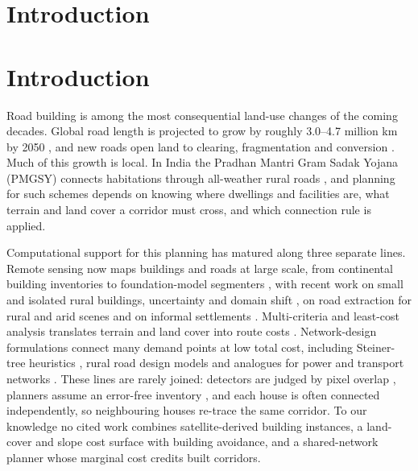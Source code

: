 \documentclass[preprint,12pt]{elsarticle}
\begin{document}
\section{Introduction}
\section{Introduction}
Road building is among the most consequential land-use changes of the coming decades. Global road length is projected to grow by roughly 3.0--4.7 million km by 2050 \cite{meijer2018global}, and new roads open land to clearing, fragmentation and conversion \cite{laurance2014global}. Much of this growth is local. In India the Pradhan Mantri Gram Sadak Yojana (PMGSY) connects habitations through all-weather rural roads \cite{pmgsy}, and planning for such schemes depends on knowing where dwellings and facilities are, what terrain and land cover a corridor must cross, and which connection rule is applied.

Computational support for this planning has matured along three separate lines. Remote sensing now maps buildings and roads at large scale, from continental building inventories \cite{sirko2021openbuildings} to foundation-model segmenters \cite{oquab2023dinov2}, with recent work on small and isolated rural buildings, uncertainty and domain shift \cite{r62,r63,r64,r65,r66,r67,r68,r69,r70}, on road extraction for rural and arid scenes \cite{r56,r57,r58,r59,r60} and on informal settlements \cite{r48}. Multi-criteria and least-cost analysis translates terrain and land cover into route costs \cite{r06,r53,r54,collischonn2000lcp}. Network-design formulations connect many demand points at low total cost, including Steiner-tree heuristics \cite{kou1981steiner,mehlhorn1988steiner,hwang1992steiner,r51}, rural road design models \cite{r41,r43,r44} and analogues for power and transport networks \cite{r45,r46,r47,r50}. These lines are rarely joined: detectors are judged by pixel overlap \cite{r01,foody2002status}, planners assume an error-free inventory \cite{heuvelink1998error}, and each house is often connected independently, so neighbouring houses re-trace the same corridor. To our knowledge no cited work combines satellite-derived building instances, a land-cover and slope cost surface with building avoidance, and a shared-network planner whose marginal cost credits built corridors.
\end{document}
